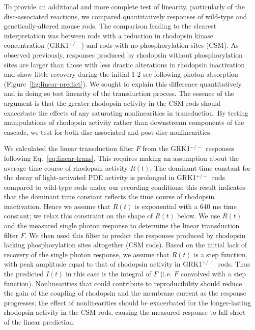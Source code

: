 \documentclass[12pt]{article}
\def\RKHET{GRK1$^{+/-}$}
\begin{document}
To provide an additional and more complete test of linearity, particularly of the disc-associated reactions, we compared quantitatively responses of wild-type and genetically-altered mouse rods.  The comparison leading to the clearest interpretation was between rods with a reduction in rhodopsin kinase concentration (\RKHET) and rods with no phosphorylation sites (CSM).  As observed previously, responses produced by rhodopsin without phosphorylation sites are larger than those with less drastic alterations in rhodopsin inactivation and show little recovery during the initial 1-2 sec following photon absorption (Figure~\ref{fig:linear-predict}).  We sought to explain this difference quantitatively and in doing so test linearity of the transduction process.  The essence of the argument is that the greater rhodopsin activity in the CSM rods should exacerbate the effects of any saturating nonlinearities in transduction.  By testing manipulations of rhodopsin activity rather than downstream components of the cascade, we test for both disc-associated and post-disc nonlinearities.

We calculated the linear transduction filter $F$ from the \RKHET~responses following Eq.~\ref{eq:linear-trans}.  This requires making an assumption about the average time course of rhodopsin activity $R(t)$.  The dominant time constant for the decay of light-activated PDE activity is prolonged in \RKHET~rods compared to wild-type rods under our recording conditions; this result indicates that the dominant time constant reflects the time course of rhodopsin inactivation.  Hence we assume that $R(t)$ is exponential with a 640 ms time constant; we relax this constraint on the shape of $R(t)$ below.  We use $R(t)$ and the measured single photon response to determine the linear transduction filter $F$.  We then used this filter to predict the responses produced by rhodopsin lacking phosphorylation sites altogether (CSM rods).  Based on the initial lack of recovery of the single photon response, we assume that $R(t)$ is a step function, with peak amplitude equal to that of rhodopsin activity in \RKHET~rods.  Thus the predicted $I(t)$ in this case is the integral of $F$ (i.e. $F$ convolved with a step function).  Nonlinearities that could contribute to reproducibility should reduce the gain of the coupling of rhodopsin and the membrane current as the response progresses; the effect of nonlinearities should be exacerbated for the longer-lasting rhodopsin activity in the CSM rods, causing the measured response to fall short of the linear prediction.  
\end{document}
